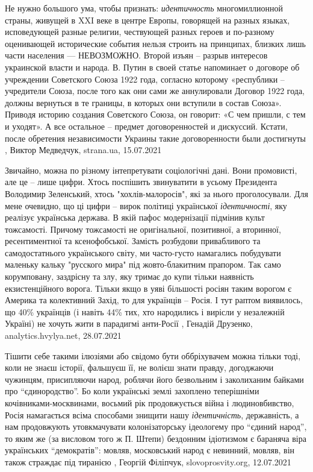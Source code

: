 Не нужно большого ума, чтобы признать: \emph{идентичность} многомиллионной
страны, живущей в XXI веке в центре Европы, говорящей на разных языках,
исповедующей разные религии, чествующей разных героев и по-разному оценивающей
исторические события нельзя строить на принципах, близких лишь части населения
— НЕВОЗМОЖНО.  Второй изъян – разрыв интересов украинской власти и народа.  В.
Путин в своей статье напоминает о договоре об учреждении Советского Союза 1922
года, согласно которому «республики – учредители Союза, после того как они сами
же аннулировали Договор 1922 года, должны вернуться в те границы, в которых они
вступили в состав Союза». Приводя историю создания Советского Союза, он
говорит: «С чем пришли, с тем и уходят». А все остальное – предмет
договоренностей и дискуссий. Кстати, после обретения независимости Украины
такие договоренности были достигнуты
, 
Виктор Медведчук, strana.ua, 15.07.2021

Звичайно, можна по різному інтепретувати соціологічні дані. Вони промовисті,
але це – лише цифри. Хтось поспішить звинуватити в усьому Президента Володимир
Зеленський, хтось "хохлів-малоросів", які за нього проголосували. Для мене
очевидно, що ці цифри – вирок політиці української \emph{ідентичності}, яку
реалізує українська держава. В якій пафос модернізації підмінив культ
тожсамості.  Причому тожсамості не оригінальної, позитивної, а вторинної,
ресентиментної та ксенофобської.  Замість розбудови привабливого та
самодостатнього українського світу, ми часто-густо намагались побудувати
маленьку кальку "русского мира" під жовто-блакитним прапором. Так само
корумповану, заздрісну та злу, яку тримає до купи тільки наявність
екзистенційного ворога. Тільки якщо в уяві більшості росіян таким ворогом є
Америка та колективний Захід, то для українців – Росія.  І тут раптом
виявилось, що 40\% українців (і навіть 44\% тих, хто народились і вирісли у
незалежній Україні) не хочуть жити в парадигмі анти-Росії
, 
Генадій Друзенко, analytics.hvylya.net, 28.07.2021

Тішити себе такими ілюзіями або свідомо бути оббріхувачем можна тільки тоді,
коли не знаєш історії, фальшуєш її, не волієш знати правду, догоджаючи
чужинцям, присипляючи народ, роблячи його безвольним і заколиханим байками про
\enquote{єдинородство}.  Бо коли українські землі захоплено теперішніми
кочівниками-москвинами, восьмий рік продовжується війна і людиновбивство, Росія
намагається всіма способами знищити нашу \emph{ідентичність}, державність, а нам
продовжують утовкмачувати колонізаторську ідеологему про \enquote{єдиний народ}, то
яким же (за висловом того ж П. Штепи) бездонним ідіотизмом є бараняча віра
українських \enquote{демократів}: мовляв, московський народ є невин­ний, мовляв, він
також страждає під тиранією
, Георгій Філіпчук, slovoprosvity.org, 12.07.2021

